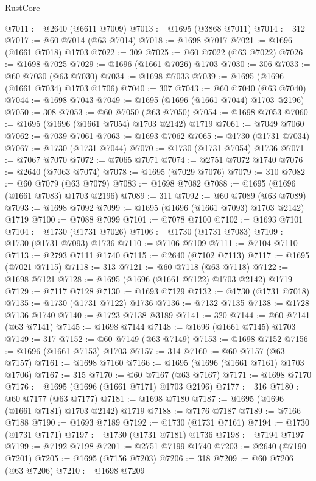 \begin{lexlean}{RustCore}
\begin{coremodule}
@7011 := @2640 (@6611 @7009)
@7013 := @1695 (@3868 @7011)
@7014 := 312
@7017 := @60 @7014 (@63 @7014)
@7018 := @1698 @7017
@7021 := @1696 (@1661 @7018) @1703
@7022 := 309
@7025 := @60 @7022 (@63 @7022)
@7026 := @1698 @7025
@7029 := @1696 (@1661 @7026) @1703
@7030 := 306
@7033 := @60 @7030 (@63 @7030)
@7034 := @1698 @7033
@7039 := @1695 (@1696 (@1661 @7034) @1703 @1706)
@7040 := 307
@7043 := @60 @7040 (@63 @7040)
@7044 := @1698 @7043
@7049 := @1695 (@1696 (@1661 @7044) @1703 @2196)
@7050 := 308
@7053 := @60 @7050 (@63 @7050)
@7054 := @1698 @7053
@7060 := @1695 (@1696 (@1661 @7054) @1703 @2142) @1719
@7061 := @7049 @7060
@7062 := @7039 @7061
@7063 := @1693 @7062
@7065 := @1730 (@1731 @7034)
@7067 := @1730 (@1731 @7044)
@7070 := @1730 (@1731 @7054) @1736
@7071 := @7067 @7070
@7072 := @7065 @7071
@7074 := @2751 @7072 @1740
@7076 := @2640 (@7063 @7074)
@7078 := @1695 (@7029 @7076)
@7079 := 310
@7082 := @60 @7079 (@63 @7079)
@7083 := @1698 @7082
@7088 := @1695 (@1696 (@1661 @7083) @1703 @2196)
@7089 := 311
@7092 := @60 @7089 (@63 @7089)
@7093 := @1698 @7092
@7099 := @1695 (@1696 (@1661 @7093) @1703 @2142) @1719
@7100 := @7088 @7099
@7101 := @7078 @7100
@7102 := @1693 @7101
@7104 := @1730 (@1731 @7026)
@7106 := @1730 (@1731 @7083)
@7109 := @1730 (@1731 @7093) @1736
@7110 := @7106 @7109
@7111 := @7104 @7110
@7113 := @2793 @7111 @1740
@7115 := @2640 (@7102 @7113)
@7117 := @1695 (@7021 @7115)
@7118 := 313
@7121 := @60 @7118 (@63 @7118)
@7122 := @1698 @7121
@7128 := @1695 (@1696 (@1661 @7122) @1703 @2142) @1719
@7129 := @7117 @7128
@7130 := @1693 @7129
@7132 := @1730 (@1731 @7018)
@7135 := @1730 (@1731 @7122) @1736
@7136 := @7132 @7135
@7138 := @1728 @7136 @1740
@7140 := @1723 @7138 @3189
@7141 := 320
@7144 := @60 @7141 (@63 @7141)
@7145 := @1698 @7144
@7148 := @1696 (@1661 @7145) @1703
@7149 := 317
@7152 := @60 @7149 (@63 @7149)
@7153 := @1698 @7152
@7156 := @1696 (@1661 @7153) @1703
@7157 := 314
@7160 := @60 @7157 (@63 @7157)
@7161 := @1698 @7160
@7166 := @1695 (@1696 (@1661 @7161) @1703 @1706)
@7167 := 315
@7170 := @60 @7167 (@63 @7167)
@7171 := @1698 @7170
@7176 := @1695 (@1696 (@1661 @7171) @1703 @2196)
@7177 := 316
@7180 := @60 @7177 (@63 @7177)
@7181 := @1698 @7180
@7187 := @1695 (@1696 (@1661 @7181) @1703 @2142) @1719
@7188 := @7176 @7187
@7189 := @7166 @7188
@7190 := @1693 @7189
@7192 := @1730 (@1731 @7161)
@7194 := @1730 (@1731 @7171)
@7197 := @1730 (@1731 @7181) @1736
@7198 := @7194 @7197
@7199 := @7192 @7198
@7201 := @2751 @7199 @1740
@7203 := @2640 (@7190 @7201)
@7205 := @1695 (@7156 @7203)
@7206 := 318
@7209 := @60 @7206 (@63 @7206)
@7210 := @1698 @7209

\end{coremodule}
\end{lexlean}
